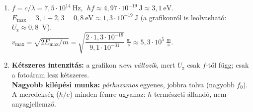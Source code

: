 \documentclass[11pt,a4paper]{article}
\begin{document}
\begin{enumerate}
\begin{enumerate}
\begin{minipage}[t]{0.42\linewidth}
      \end{minipage}
    \item $f = c/\lambda = 7{,}5\cdot 10^{14}~\text{Hz}$, $\;hf \approx 4{,}97\cdot
      10^{-19}~\text{J} \approx 3{,}1~\text{eV}$.\\
      $E_\text{max} = 3{,}1 - 2{,}3 = 0{,}8~\text{eV} \approx 1{,}3\cdot 10^{-19}~\text{J}$
      (a grafikonról is leolvasható: $U_\text{z} \approx 0{,}8$~V).\\
      $v_\text{max} = \sqrt{2E_\text{max}/m} = \sqrt{\dfrac{2\cdot 1{,}3\cdot 10^{-19}}
      {9{,}1\cdot 10^{-31}}}~\tfrac{\text{m}}{\text{s}} \approx
      5{,}3\cdot 10^{5}~\tfrac{\text{m}}{\text{s}}$.
    \item \textbf{Kétszeres intenzitás:} a grafikon \emph{nem változik}, mert
      $U_\text{z}$ csak $f$-től függ; csak a fotoáram lesz kétszeres.\\
      \textbf{Nagyobb kilépési munka:} \emph{párhuzamos} egyenes, jobbra tolva (nagyobb
      $f_0$). A meredekség ($h/e$) minden fémre ugyanaz: $h$ természeti állandó, nem
      anyagjellemző.
  \end{enumerate}


\end{enumerate}
\end{document}
